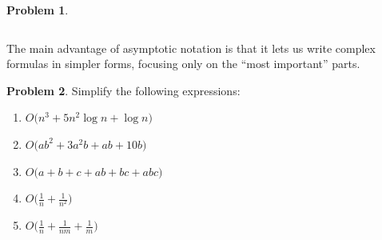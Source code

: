 \documentclass[10pt]{article}
\theoremstyle{definition}
\newtheorem{problem}{Problem}
\begin{document}
\begin{problem}
{\begin{tabular}{c c c c c c}
\end{tabular}
}
\end{problem}


\newpage
The main advantage of asymptotic notation is that it lets us write complex formulas in simpler forms,
focusing only on the ``most important'' parts.
\begin{problem}
    Simplify the following expressions:

\begin{enumerate}
    \item $O\bigg(n^3 + 5n^2\log n + \log n \bigg)$
    \vspace{1.5in}
\item $O\bigg(ab^2 + 3a^2b + ab + 10b\bigg)$
    \vspace{1.5in}
\item $O\bigg(a + b + c + ab + bc + abc\bigg)$
    \vspace{1.5in}
\item $O\bigg(\frac 1 n + \frac 1 {n^2}\bigg)$
    \vspace{1.5in}
\item $O\bigg(\frac 1 n + \frac 1 {nm} + \frac 1 m \bigg)$
    \vspace{1.5in}
\end{enumerate}
\end{problem}
\end{document}
